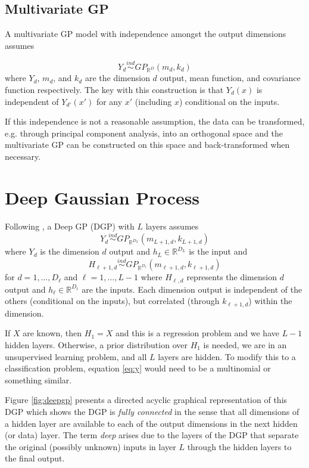 \documentclass{article}
\newcommand{\ind}{\stackrel{ind}{\sim}}
\newcommand{\1}{\mathbbm{1}}
\begin{document}
\subsection{Multivariate GP}

A multivariate GP model with independence amongst the output dimensions assumes

\[
Y_d \ind GP_{\mathbb{R}^{D}}(m_{d},k_{d})
\]
where $Y_d$, $m_d$, and $k_d$ are the dimension $d$ output, mean function,
and covariance function respectively.
The key with this construction is that $Y_d(x)$ is independent of
$Y_{d'}(x')$ for any $x'$ (including $x$) conditional on the inputs.

If this independence is not a reasonable assumption,
the data can be transformed,
e.g. through principal component analysis, into an orthogonal space and
the multivariate GP can be constructed on this space and
back-transformed when necessary.




\section{Deep Gaussian Process}
\label{sec:deepgp}

Following \cite{damianou2013deep},
a Deep GP (DGP) with $L$ layers assumes
\begin{equation}
Y_d \ind GP_{\mathbb{R}^{D_L}}(m_{L+1,d},k_{L+1,d})
\label{eq:y}
\end{equation}
where $Y_d$ is the dimension $d$ output and $h_L \in \mathbb{R}^{D_L}$ is the
input
and
\[
H_{\ell+1,d} \ind GP_{\mathbb{R}^{D_\ell}}(m_{\ell+1,d},k_{\ell+1,d})
\]
for $d=1,\ldots,D_{\ell}$ and $\ell = 1,\ldots,L-1$
where $H_{\ell,d}$ represents the dimension $d$ output and
$h_{\ell} \in \mathbb{R}^{D_{\ell}}$ are the inputs.
Each dimension output is independent of the others (conditional on the inputs),
but correlated (through $k_{\ell+1,d}$) within the dimension.

If $X$ are known, then $H_1 = X$ and this is a regression problem and we have
$L-1$ hidden layers.
Otherwise, a prior distribution over $H_1$ is needed, we are in an
unsupervised learning problem, and all $L$ layers are hidden.
To modify this to a classification problem, equation \eqref{eq:y} would need to
be a multinomial or something similar.

Figure \ref{fig:deepgp} presents a directed acyclic graphical representation
of this DGP which shows the DGP is \emph{fully connected} in the sense that all
dimensions of a hidden layer are available to each of the output dimensions
in the next hidden (or data) layer.
The term \emph{deep} arises due to the layers of the DGP that separate
the original (possibly unknown) inputs in layer $L$ through the hidden layers
to the final output.

\end{document}
